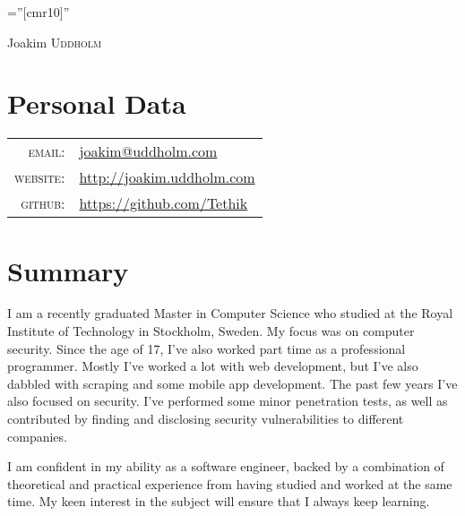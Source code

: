 \documentclass[a4paper,10pt]{article}
\begin{document}
\pagestyle{empty} %

\font\fb=''[cmr10]'' %

\par{\centering
		{\Huge Joakim \textsc{Uddholm}
	}\bigskip\par}

\section{Personal Data}

\begin{tabular}{rl}
    \textsc{email:}     & \href{mailto:joakim@uddholm.com}{joakim@uddholm.com}\\
    \textsc{website:}   & \href{http://joakim.uddholm.com}{http://joakim.uddholm.com}\\    
    \textsc{github:}   & \href{https://github.com/Tethik}{https://github.com/Tethik}\\    
\end{tabular}

\section{Summary}
I am a recently graduated Master in Computer Science who studied at the Royal Institute of Technology in Stockholm, Sweden. 
My focus was on computer security. Since the age of 17, I've also worked part time as a professional 
programmer. Mostly I've worked a lot with web development, but I've also dabbled with scraping and some mobile app development. 
The past few years I've also focused on security. I've performed some minor penetration tests, as well as 
contributed by finding and disclosing security vulnerabilities to different companies.

I am confident in my ability as a software engineer, backed by a combination of theoretical and practical experience 
from having studied and worked at the same time. My keen interest in the subject will ensure that I always keep learning.
\end{document}
